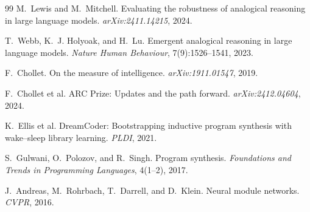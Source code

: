 \documentclass[11pt,a4paper]{article}
\theoremstyle{plain}
\theoremstyle{definition}
\theoremstyle{remark}
\begin{document}
\begin{thebibliography}{99}
M.~Lewis and M.~Mitchell.
Evaluating the robustness of analogical reasoning in large language models.
\emph{arXiv:2411.14215}, 2024.

T.~Webb, K.~J. Holyoak, and H.~Lu.
Emergent analogical reasoning in large language models.
\emph{Nature Human Behaviour}, 7(9):1526--1541, 2023.

F.~Chollet.
On the measure of intelligence.
\emph{arXiv:1911.01547}, 2019.

F.~Chollet et al.
ARC Prize: Updates and the path forward.
\emph{arXiv:2412.04604}, 2024.

K.~Ellis et al.
DreamCoder: Bootstrapping inductive program synthesis with wake--sleep library learning.
\emph{PLDI}, 2021.

S.~Gulwani, O.~Polozov, and R.~Singh.
Program synthesis.
\emph{Foundations and Trends in Programming Languages}, 4(1--2), 2017.

J.~Andreas, M.~Rohrbach, T.~Darrell, and D.~Klein.
Neural module networks.
\emph{CVPR}, 2016.

\end{thebibliography}
\end{document}
